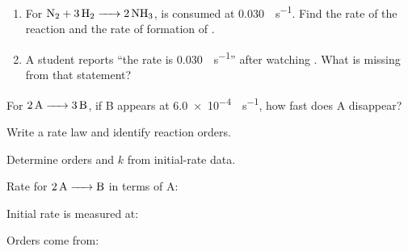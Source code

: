 \documentclass{apchem-notes}
\begin{document}

\begin{enumerate}[leftmargin=*,itemsep=0.4em]
  \item For $\ce{N2 + 3H2 -> 2NH3}$,  is consumed at
        \SI{0.030}{\Molar\per\second}. Find the rate of the reaction and the
        rate of formation of . \workspace[2.4cm]
  \item A student reports ``the rate is
        \SI{0.030}{\Molar\per\second}'' after watching . What is
        missing from that statement? 
\end{enumerate}

\begin{exitticket}
For $\ce{2A -> 3B}$, if B appears at \SI{6.0e-4}{\Molar\per\second}, how
fast does A disappear?
\end{exitticket}


\begin{objectives}
  \item Write a rate law and identify reaction orders.
  \item Determine orders and $k$ from initial-rate data.
\end{objectives}


\begin{warmup}[3]
  \item Rate for $\ce{2A -> B}$ in terms of A:
  \item Initial rate is measured at: 
  \item Orders come from: 
\end{warmup}
\end{document}

